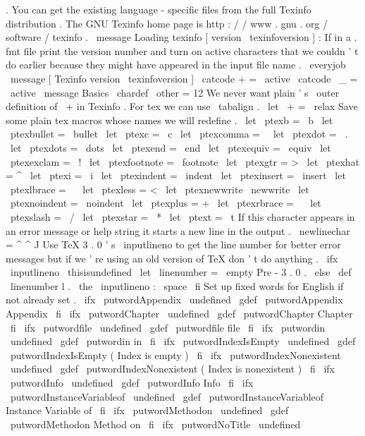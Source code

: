 .
You
can
get
the
existing
language
-
specific
files
from
the
%
full
Texinfo
distribution
.
%
%
The
GNU
Texinfo
home
page
is
http
:
/
/
www
.
gnu
.
org
/
software
/
texinfo
.
\
message
{
Loading
texinfo
[
version
\
texinfoversion
]
:
}
%
If
in
a
.
fmt
file
print
the
version
number
%
and
turn
on
active
characters
that
we
couldn
'
t
do
earlier
because
%
they
might
have
appeared
in
the
input
file
name
.
\
everyjob
{
\
message
{
[
Texinfo
version
\
texinfoversion
]
}
%
\
catcode
+
=
\
active
\
catcode
\
_
=
\
active
}
\
message
{
Basics
}
\
chardef
\
other
=
12
%
We
never
want
plain
'
s
\
outer
definition
of
\
+
in
Texinfo
.
%
For
tex
we
can
use
\
tabalign
.
\
let
\
+
=
\
relax
%
Save
some
plain
tex
macros
whose
names
we
will
redefine
.
\
let
\
ptexb
=
\
b
\
let
\
ptexbullet
=
\
bullet
\
let
\
ptexc
=
\
c
\
let
\
ptexcomma
=
\
\
let
\
ptexdot
=
\
.
\
let
\
ptexdots
=
\
dots
\
let
\
ptexend
=
\
end
\
let
\
ptexequiv
=
\
equiv
\
let
\
ptexexclam
=
\
!
\
let
\
ptexfootnote
=
\
footnote
\
let
\
ptexgtr
=
>
\
let
\
ptexhat
=
^
\
let
\
ptexi
=
\
i
\
let
\
ptexindent
=
\
indent
\
let
\
ptexinsert
=
\
insert
\
let
\
ptexlbrace
=
\
{
\
let
\
ptexless
=
<
\
let
\
ptexnewwrite
\
newwrite
\
let
\
ptexnoindent
=
\
noindent
\
let
\
ptexplus
=
+
\
let
\
ptexrbrace
=
\
}
\
let
\
ptexslash
=
\
/
\
let
\
ptexstar
=
\
*
\
let
\
ptext
=
\
t
%
If
this
character
appears
in
an
error
message
or
help
string
it
%
starts
a
new
line
in
the
output
.
\
newlinechar
=
^
^
J
%
Use
TeX
3
.
0
'
s
\
inputlineno
to
get
the
line
number
for
better
error
%
messages
but
if
we
'
re
using
an
old
version
of
TeX
don
'
t
do
anything
.
%
\
ifx
\
inputlineno
\
thisisundefined
\
let
\
linenumber
=
\
empty
%
Pre
-
3
.
0
.
\
else
\
def
\
linenumber
{
l
.
\
the
\
inputlineno
:
\
space
}
\
fi
%
Set
up
fixed
words
for
English
if
not
already
set
.
\
ifx
\
putwordAppendix
\
undefined
\
gdef
\
putwordAppendix
{
Appendix
}
\
fi
\
ifx
\
putwordChapter
\
undefined
\
gdef
\
putwordChapter
{
Chapter
}
\
fi
\
ifx
\
putwordfile
\
undefined
\
gdef
\
putwordfile
{
file
}
\
fi
\
ifx
\
putwordin
\
undefined
\
gdef
\
putwordin
{
in
}
\
fi
\
ifx
\
putwordIndexIsEmpty
\
undefined
\
gdef
\
putwordIndexIsEmpty
{
(
Index
is
empty
)
}
\
fi
\
ifx
\
putwordIndexNonexistent
\
undefined
\
gdef
\
putwordIndexNonexistent
{
(
Index
is
nonexistent
)
}
\
fi
\
ifx
\
putwordInfo
\
undefined
\
gdef
\
putwordInfo
{
Info
}
\
fi
\
ifx
\
putwordInstanceVariableof
\
undefined
\
gdef
\
putwordInstanceVariableof
{
Instance
Variable
of
}
\
fi
\
ifx
\
putwordMethodon
\
undefined
\
gdef
\
putwordMethodon
{
Method
on
}
\
fi
\
ifx
\
putwordNoTitle
\
undefined
